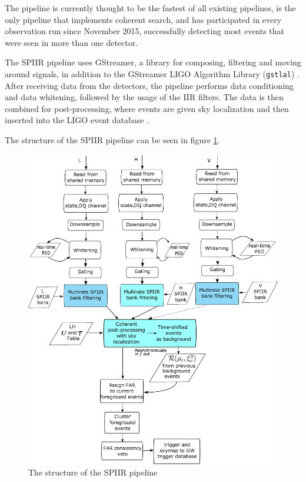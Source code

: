 \documentclass{article}
\begin{document}
The pipeline is currently thought to be the fastest of all existing pipelines, is the only pipeline that implements coherent search, and has participated in every observation run since November 2015, successfully detecting most events that were seen in more than one detector.

The SPIIR pipeline uses GStreamer, a library for composing, filtering and moving around signals, in addition to the GStreamer LIGO Algorithm Library (\texttt{gstlal}) \cite{gstlal}.
After receiving data from the detectors, the pipeline performs data conditioning and data whitening, followed by the usage of the IIR filters.
The data is then combined for post-processing, where events are given sky localization and then inserted into the LIGO event database \cite{SPIIRGPU2018}.

The structure of the SPIIR pipeline can be seen in figure \ref{fig:spiir_structure}.

\begin{figure}
    \label{fig:spiir_structure}
    \centering
    \includegraphics[scale=0.18]{../seminar-presentation/online_xdet.jpg}
    \caption{The structure of the SPIIR pipeline}
\end{figure}
\end{document}

